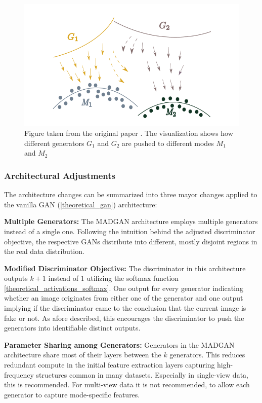 \begin{figure}[htbp]
    \centering
    \includegraphics[width=.9\textwidth]{abb/madgan_diverse_mode_push.PNG}
    \caption{Figure taken from the original paper \cite{ghosh2018madgan}. The visualization shows how different generators \(G_{1}\) and \(G_{2}\) are pushed to different modes \(M_{1}\) and \(M_{2}\)}
    \label{fig:figure_madgan_diverse_mode_push}
\end{figure}

\subsubsection{Architectural Adjustments}
\label{theory_madgan_architecture}
The architecture changes can be summarized into three mayor changes applied to the vanilla GAN (\ref{theoretical_gan}) architecture:

\noindent\textbf{Multiple Generators:} The MADGAN architecture employs multiple generators instead of a single one. Following the intuition behind the adjusted discriminator objective, the respective GANs distribute into different, mostly disjoint regions in the real data distribution.

\noindent\textbf{Modified Discriminator Objective:} The discriminator in this architecture outputs \(k + 1\) instead of \(1\) utilizing the softmax function \ref{theoretical_activations_softmax}. One output for every generator indicating whether an image originates from either one of the generator and one output implying if the discriminator came to the conclusion that the current image is fake or not. As afore described, this encourages the discriminator to push the generators into identifiable distinct outputs.

\noindent\textbf{Parameter Sharing among Generators:} Generators in the MADGAN architecture share most of their layers between the \(k\) generators. This reduces redundant compute in the initial feature extraction layers capturing high-frequency structures common in many datasets. Especially in single-view data, this is recommended. For multi-view data it is not recommended, to allow each generator to capture mode-specific features.

